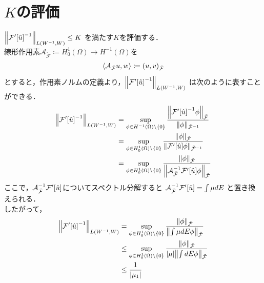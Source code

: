 \section{\(K\)の評価}%
\(\norm{\mathcal{F}'\qty[\hat{u}]^{-1}}_{L(W^{-1},W)} \leq K\)
を満たす\(K\)を評価する．\\
線形作用素\(\mathcal{A}_{\tilde{\mathcal{F}}}\coloneqq H^1_0(\Omega)\rightarrow H^{-1}(\Omega)\)を
\begin{align}
   \langle \mathcal{A}_{\tilde{\mathcal{F}}} u , w \rangle 
   \coloneqq 
   \qty(u,v)_{\tilde{\mathcal{F}}}
\end{align}
とすると，作用素ノルムの定義より，\(\norm{\mathcal{F}'\qty[\hat{u}]^{-1}}_{L\qty(W^{-1},W)} \)
は次のように表すことができる．
\begin{align}
    \norm{\mathcal{F}'\qty[\hat{u}]^{-1}}_{L\qty(W^{-1},W)} 
    &=
    \sup\limits_{\phi \in H^{-1}(\Omega) \backslash \{ 0 \} }
    \dfrac{\norm{\mathcal{F}'\qty[\hat{u}]^{-1}\phi}_{\tilde{\mathcal{F}}}}{\norm{\phi}_{\tilde{\mathcal{F}}^{-1}}}\\
    &=
    \sup\limits_{\phi \in H^1_0 (\Omega)\backslash \{ 0 \} }
    \dfrac{\norm{\phi}_{\tilde{\mathcal{F}}}}{\norm{\mathcal{F}'\qty[\hat{u}]\phi}_{\tilde{\mathcal{F}}^{-1}}}\\
    &=
    \sup\limits_{\phi \in H^1_0 (\Omega)\backslash \{ 0 \} }
    \dfrac{\norm{\phi}_{\tilde{\mathcal{F}}}}{\norm{\mathcal{A}_{\tilde{\mathcal{F}}}^{-1} \mathcal{F}'\qty[\hat{u}] \phi}_{\tilde{\mathcal{F}}}}\\
\end{align}
ここで，\(\mathcal{A}_{\tilde{\mathcal{F}}}^{-1} \mathcal{F}'\qty[\hat{u}]\)についてスペクトル分解すると
\(\mathcal{A}_{\tilde{\mathcal{F}}}^{-1} \mathcal{F}'\qty[\hat{u}] = \int \mu d E\)
と置き換えられる．\\
したがって，
\begin{align}
  \norm{\mathcal{F}'\qty[\hat{u}]^{-1}}_{L\qty(W^{-1},W)} 
  &=
  \sup\limits_{\phi \in H^1_0 (\Omega)\backslash \{ 0 \} }
  \dfrac{\norm{\phi}_{\tilde{\mathcal{F}}}}{\norm{\int \mu d E\phi}_{\tilde{\mathcal{F}}}}\\
  &\leq
  \sup\limits_{\phi \in H^1_0 (\Omega)\backslash \{ 0 \} }
  \dfrac{\norm{\phi}_{\tilde{\mathcal{F}}}}{|\mu |\norm{\int d E\phi}_{\tilde{\mathcal{F}}}}\\
  &\leq
  \dfrac{1}{|\mu_1|}
\end{align}
